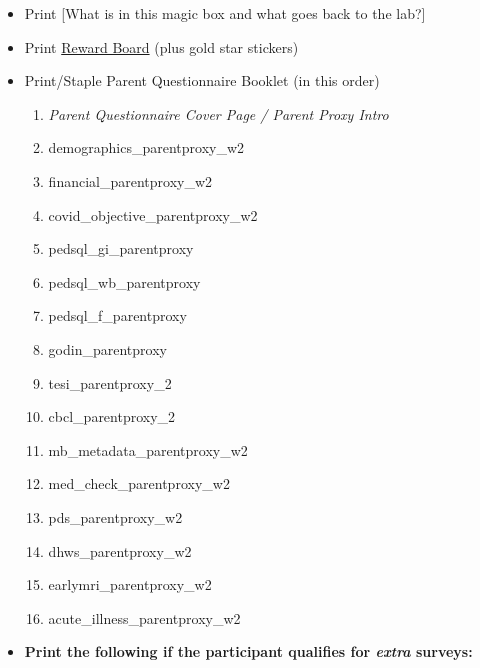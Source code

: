 \documentclass[]{book}
\providecommand{\tightlist}{%
  \setlength{\itemsep}{0pt}\setlength{\parskip}{0pt}}
\begin{document}
\begin{itemize}
\item
  Print {[}What is in this magic box and what goes back to the lab?{]}
\item
  Print \href{https://ucla.app.box.com/file/668504120930}{Reward Board} (plus gold star stickers)
\item
  Print/Staple Parent Questionnaire Booklet (in this order)

  \begin{enumerate}
  \def\labelenumi{\arabic{enumi}.}
  \tightlist
  \item
    \emph{Parent Questionnaire Cover Page / Parent Proxy Intro}
  \item
    demographics\_parentproxy\_w2
  \item
    financial\_parentproxy\_w2
  \item
    covid\_objective\_parentproxy\_w2
  \item
    pedsql\_gi\_parentproxy
  \item
    pedsql\_wb\_parentproxy
  \item
    pedsql\_f\_parentproxy
  \item
    godin\_parentproxy\\
  \item
    tesi\_parentproxy\_2
  \item
    cbcl\_parentproxy\_2
  \item
    mb\_metadata\_parentproxy\_w2
  \item
    med\_check\_parentproxy\_w2
  \item
    pds\_parentproxy\_w2
  \item
    dhws\_parentproxy\_w2
  \item
    earlymri\_parentproxy\_w2
  \item
    acute\_illness\_parentproxy\_w2
  \end{enumerate}
\item
  \textbf{Print the following if the participant qualifies for \emph{extra} surveys:}


\end{itemize}
\end{document}

